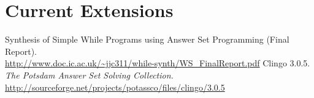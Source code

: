 \documentclass[a4paper,twoside,notitlepage,12pt]{article}
\begin{document}
\section{Current Extensions}

\begin{thebibliography}{9}
        Synthesis of Simple While Programs using Answer Set Programming (Final Report). 
        \\ \url{http://www.doc.ic.ac.uk/~jjc311/while-synth/WS_FinalReport.pdf}
        Clingo 3.0.5. \emph{The Potsdam Answer Set Solving Collection.}
        \\ \url{http://sourceforge.net/projects/potassco/files/clingo/3.0.5}
\end{thebibliography}
\end{document}
